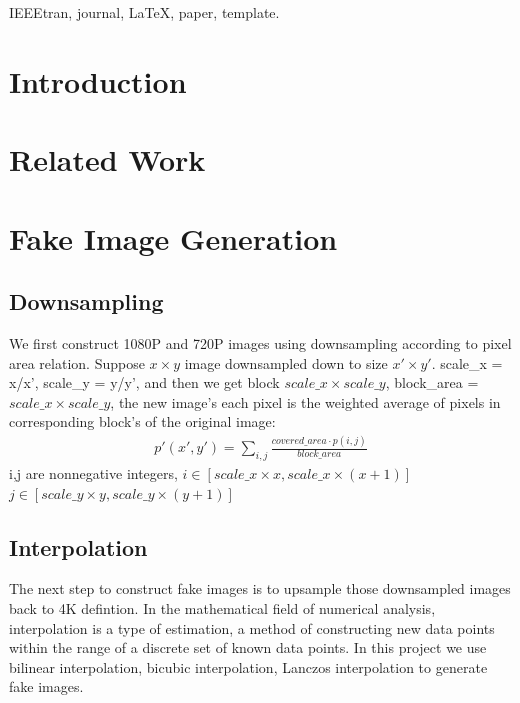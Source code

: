 \documentclass[journal,conference]{IEEEtran}
\begin{document}
\begin{IEEEkeywords}
IEEEtran, journal, \LaTeX, paper, template.
\end{IEEEkeywords}


\IEEEpeerreviewmaketitle



\section{Introduction}

\section{Related Work}
\section{Fake Image Generation}

\subsection{Downsampling}
We first construct 1080P and 720P images using downsampling according to pixel area relation. Suppose $x\times y$ image downsampled down to size $x'\times y'$. scale\_x = x/x', scale\_y = y/y', and then we get block $scale\_x \times scale\_y$, block\_area = $scale\_x \times scale\_y$, the new image's each pixel is the weighted average of pixels in corresponding block's of the original image: 
\begin{align*}
	p'(x',y')=\sum_{i,j}{\frac{covered\_area \cdot p(i,j)}{block\_area}}
\end{align*}
i,j are nonnegative integers, $i \in [scale\_x\times x,scale\_x\times (x+1)]$ $j \in [scale\_y\times y,scale\_y\times (y+1)]$

\subsection{Interpolation}
The next step to construct fake images is to upsample those downsampled images back to 4K defintion.
In the mathematical field of numerical analysis, interpolation is a type of estimation, a method of constructing new data points within the range of a discrete set of known data points.
In this project we use bilinear interpolation, bicubic interpolation, Lanczos interpolation to generate fake images.
\end{document}
